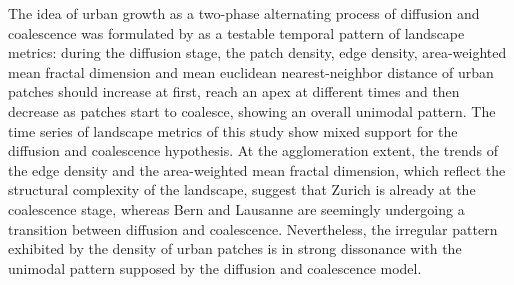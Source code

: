 The idea of urban growth as a two-phase alternating process of diffusion and coalescence was formulated by \cite{dietzel2005spatio} as a testable temporal pattern of landscape metrics: during the diffusion stage, the patch density, edge density, area-weighted mean fractal dimension and mean euclidean nearest-neighbor distance of urban patches should increase at first, reach an apex at different times and then decrease as patches start to coalesce, showing an overall unimodal pattern.
The time series of landscape metrics of this study show mixed support for the diffusion and coalescence hypothesis.
At the agglomeration extent, the trends of the edge density and the area-weighted mean fractal dimension, which reflect the structural complexity of the landscape, suggest that Zurich is already at the coalescence stage, whereas Bern and Lausanne are seemingly undergoing a transition between diffusion and coalescence.
Nevertheless, the irregular pattern exhibited by the density of urban patches is in strong dissonance with the unimodal pattern supposed by the diffusion and coalescence model.
